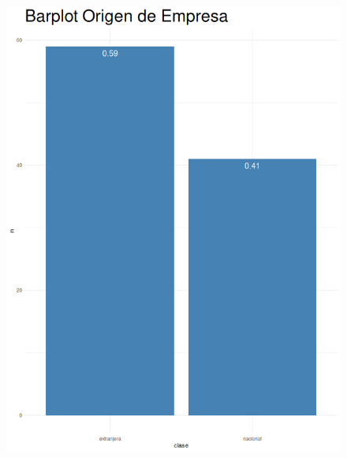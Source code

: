 \documentclass{article}
\begin{document}
    \begin{center}
        \begin{minipage}{0.6\linewidth}
            \begin{minipage}{0.45\linewidth}
                \begin{figure}[H]
                    \includegraphics[width=\linewidth]{../bar1.png}
                \end{figure} 
            \end{minipage}
            \hspace{0.05\linewidth} 
            \begin{minipage}{0.45\linewidth}
                \begin{figure}[H]

\end{figure}
\end{minipage}
\end{minipage}
\end{center}
\end{document}
